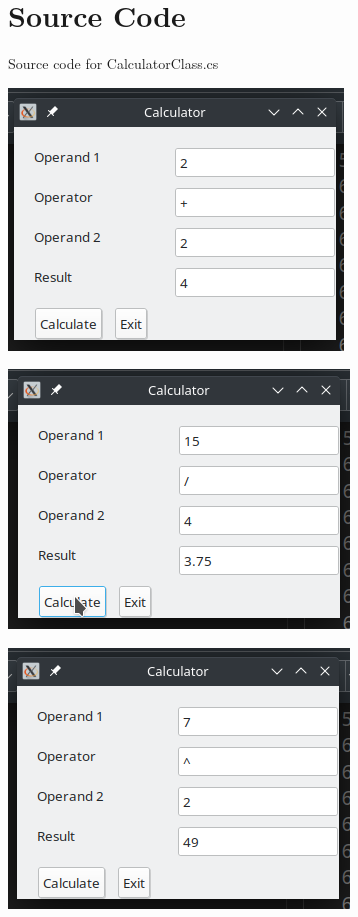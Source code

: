 \documentclass[12pt]{article}
\begin{document}
\maketitle
\pagebreak


\section{Source Code}

Source code for \textsf{CalculatorClass.cs}


\newpage



\newpage

\includegraphics{Ex1}

\includegraphics{Ex2}

\includegraphics{Ex3}
\end{document}
